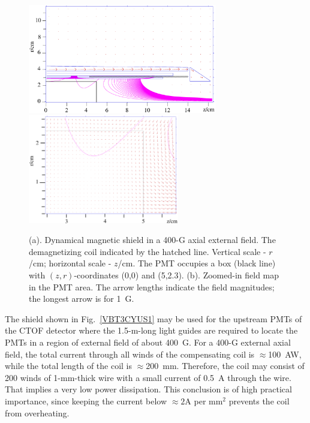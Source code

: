 \documentclass[12pt]{article}
\begin{document}
\begin{figure}[ht]
\centering
\subfloat[]
{\includegraphics[height=4.75cm]{Tapered400G.eps}\label{VBT3CYUS1}}
\qquad
\subfloat[]
{\includegraphics[height=4.75cm]{Tapered400Gzoom.eps}\label{VBT3CYUS2}}
\caption{(a). Dynamical magnetic shield in a 400-G axial external field. The
demagnetizing coil indicated by the hatched line. Vertical scale - $r$/cm; horizontal 
scale - $z$/cm. The PMT occupies a box (black line) with $(z,r)$-coordinates (0,0) 
and (5,2.3). (b). Zoomed-in field map in the PMT area. The arrow lengths indicate 
the field magnitudes; the longest arrow is for 1~G.}
\end{figure}

The shield shown in Fig.~\ref{VBT3CYUS1} may be used for the upstream PMTs of
the CTOF detector where the 1.5-m-long light guides are required to locate the
PMTs in a region of external field of about 400~G. For a 400-G external axial 
field, the total current through all winds of the compensating coil is 
$\approx$100~AW, while the total length of the coil is $\approx$200~mm. Therefore, 
the coil may consist of 200 winds of 1-mm-thick wire with a small current of 0.5~A 
through the wire. That implies a very low power dissipation. This conclusion is of 
high practical importance, since keeping the current below $\approx2$A per mm$^2$ 
prevents the coil from overheating.
\end{document}
